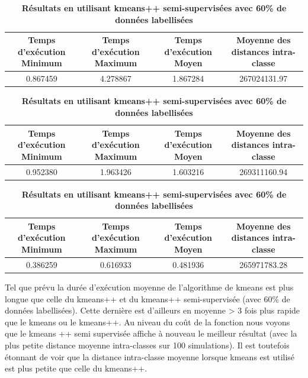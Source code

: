 \documentclass[12pt,a4paper]{book}
\newcommand{\1}{\mathds{1}}
\begin{document}
\begin{table}[ht]
\centering

\vspace{10 mm}
\caption{\textbf{Résultats en utilisant kmeans}} 

\begin{tabular}{c|c|c|c}
\hline
\rowcolor{Gray}
Temps d'exécution Minimum & Temps d'exécution Maximum & Temps d'exécution Moyen & Moyenne des distances intra-classe \\
\hline
0.867459&4.278867& 1.867284& \cellcolor{LightCyan}267024131.97\\

\end{tabular}

\centering

\vspace{10 mm}
\caption{\textbf{Résultats en utilisant kmeans++}} 

\begin{tabular}{c|c|c|c}
\hline
\rowcolor{Gray}
Temps d'exécution Minimum & Temps d'exécution Maximum & Temps d'exécution Moyen & Moyenne des distances intra-classe \\
\hline
0.952380&1.963426& 1.603216& \cellcolor{LightCyan}269311160.94\\

\end{tabular}

\centering

\vspace{10 mm}
\caption{\textbf{Résultats en utilisant kmeans++ semi-supervisées avec 60\% de données labellisées}} 

\begin{tabular}{c|c|c|c}
\hline
\rowcolor{Gray}
Temps d'exécution Minimum & Temps d'exécution Maximum & Temps d'exécution Moyen & Moyenne des distances intra-classe \\
\hline
0.386259&0.616933& 0.481936& \cellcolor{LightCyan}265971783.28\\
\end{tabular}

\end{table}

\vspace{10 mm}


\noindent 
Tel que prévu la durée d'exécution moyenne de l'algorithme de kmeans est plus longue que celle du kmeans++ et du kmeans++ semi-supervisée (avec 60\% de données labellisées). Cette dernière est d'ailleurs en moyenne > 3 fois plus rapide que le kmeans ou le kmeans++. Au niveau du coût de la fonction nous voyons que le kmeans ++ semi supervisée affiche à nouveau le meilleur résultat (avec la plus petite distance moyenne intra-classes sur 100 simulations). Il est toutefois étonnant de voir que la distance intra-classe moyenne lorsque kmeans est utilisé est plus petite que celle du kmeans++. 
\end{document}
